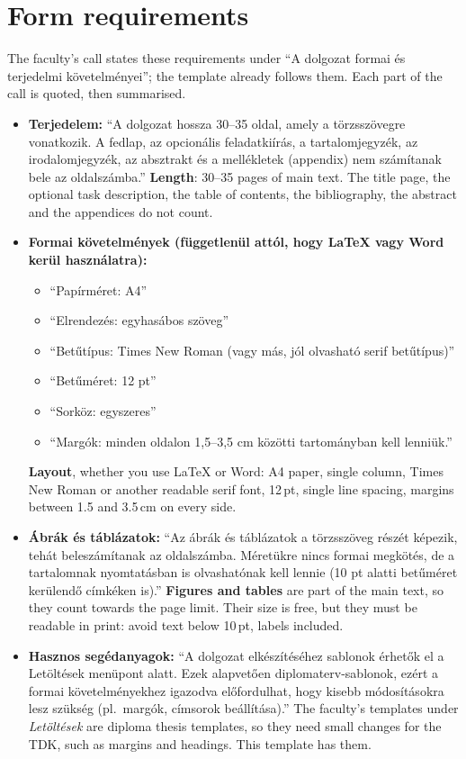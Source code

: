 \section{Form requirements}\label{app:tdk:form}
The faculty's call states these requirements under \enquote{A dolgozat formai és terjedelmi követelményei}; the template already follows them. Each part of the call is quoted, then summarised.
\begin{itemize}
  \item \textbf{Terjedelem:} \enquote{A dolgozat hossza 30--35 oldal, amely a törzsszövegre vonatkozik. A fedlap, az opcionális feladatkiírás, a tartalomjegyzék, az irodalomjegyzék, az absztrakt és a mellékletek (appendix) nem számítanak bele az oldalszámba.}
  \textbf{Length}: 30--35 pages of main text. The title page, the optional task description, the table of contents, the bibliography, the abstract and the appendices do not count.
  \item \textbf{Formai követelmények (függetlenül attól, hogy LaTeX vagy Word kerül használatra):}
  \begin{itemize}[noitemsep]
    \item \enquote{Papírméret: A4}
    \item \enquote{Elrendezés: egyhasábos szöveg}
    \item \enquote{Betűtípus: Times New Roman (vagy más, jól olvasható serif betűtípus)}
    \item \enquote{Betűméret: 12 pt}
    \item \enquote{Sorköz: egyszeres}
    \item \enquote{Margók: minden oldalon 1,5--3,5 cm közötti tartományban kell lenniük.}
  \end{itemize}
  \textbf{Layout}, whether you use \LaTeX{} or Word: A4 paper, single column, Times New Roman or another readable serif font, 12\,pt, single line spacing, margins between 1.5 and 3.5\,cm on every side.
  \item \textbf{Ábrák és táblázatok:} \enquote{Az ábrák és táblázatok a törzsszöveg részét képezik, tehát beleszámítanak az oldalszámba. Méretükre nincs formai megkötés, de a tartalomnak nyomtatásban is olvashatónak kell lennie (10 pt alatti betűméret kerülendő címkéken is).}
  \textbf{Figures and tables} are part of the main text, so they count towards the page limit. Their size is free, but they must be readable in print: avoid text below 10\,pt, labels included.
  \item \textbf{Hasznos segédanyagok:} \enquote{A dolgozat elkészítéséhez sablonok érhetők el a Letöltések menüpont alatt. Ezek alapvetően diplomaterv-sablonok, ezért a formai követelményekhez igazodva előfordulhat, hogy kisebb módosításokra lesz szükség (pl.\ margók, címsorok beállítása).}
  The faculty's templates under \emph{Letöltések} are diploma thesis templates, so they need small changes for the TDK, such as margins and headings. This template has them.
\end{itemize}
